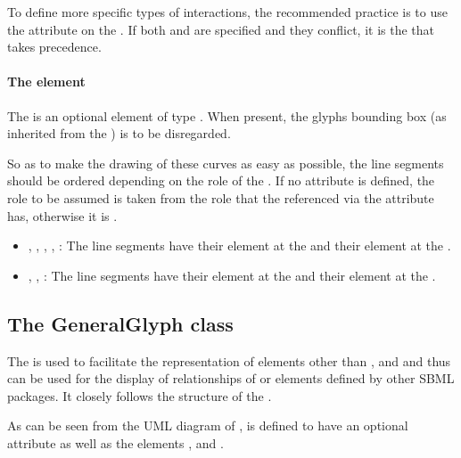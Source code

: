 To define more specific types of interactions,
the recommended practice is to use the  attribute on
the \SpeciesReference. If both  and  are specified
and they conflict, it is the  that takes precedence. 


\paragraph{The  element}
The  is an optional element of type \Curve. When present, 
the glyphs bounding box (as inherited from the \GraphicalObject) is to 
be disregarded. 

So as to make the drawing of these curves as easy as possible, the line 
segments should be ordered depending on the role of the 
\SpeciesReferenceGlyph. If no  attribute is defined, the role 
to be assumed is taken from the role that the \SpeciesReference 
referenced via the attribute  has, otherwise it 
is . 

\begin{itemize}
	\item {}, , , 
	, : The line segments have their 
	 element at the \ReactionGlyph and their  
	element at the \SpeciesGlyph.

	\item {}, 
	, : The line segments have their 
	 element at the \SpeciesGlyph and their  element 
	at the \ReactionGlyph.
\end{itemize}

\subsection{The GeneralGlyph class}
\label{generalglyph-class}
The \GeneralGlyph is used to facilitate the representation of elements 
other than \Compartment, \Species and \Reaction and thus can be used for 
the display of relationships of \Rule or elements defined by other SBML 
packages. It closely follows the structure of the \ReactionGlyph.

As can be seen from the UML diagram of ,
\GeneralGlyph is defined to have an optional attribute  
as well as the elements ,  and 
. 

